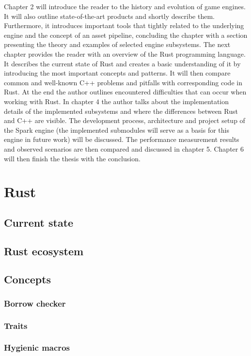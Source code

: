 \documentclass[MGS, Master, english]{twbook}
\begin{document}
Chapter 2 will introduce the reader to the history and evolution of game engines. It will also outline state-of-the-art products and shortly describe them. Furthermore, it introduces important tools that tightly related to the underlying engine and the concept of an asset pipeline, concluding the chapter with a section presenting the theory and examples of selected engine subsystems.
The next chapter provides the reader with an overview of the Rust programming language. It describes the current state of Rust and creates a basic understanding of it by introducing the most important concepts and patterns. It will then compare common and well-known C++ problems and pitfalls with corresponding code in Rust. At the end the author outlines encountered difficulties that can occur when working with Rust. 
In chapter 4 the author talks about the implementation details of the implemented subsystems and where the differences between Rust and C++ are visible. The development process, architecture and project setup of the Spark engine (the implemented submodules will serve as a basis for this engine in future work) will be discussed. The performance measurement results and observed scenarios are then compared and discussed in chapter 5. Chapter 6 will then finish the thesis with the conclusion.



\chapter{Rust}
\blindtext
\section{Current state}
\blindtext
\section{Rust ecosystem}
\blindtext
\section{Concepts}
\blindtext
\subsection{Borrow checker}
\blindtext
\subsection{Traits}
\blindtext
\subsection{Hygienic macros}
\blindtext
\end{document}
